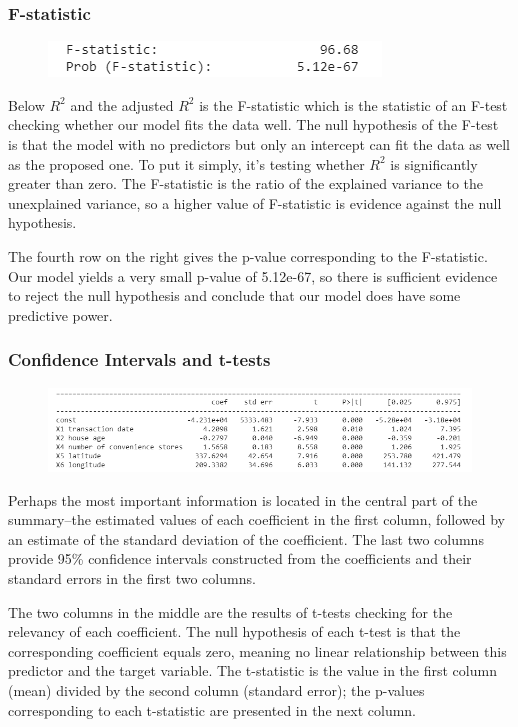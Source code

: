 \documentclass{article}
\begin{document}
\subsubsection*{F-statistic}
\begin{figure}[H]\includegraphics[width=0.5\linewidth]{27}\end{figure}
Below $R^2$ and the adjusted $R^2$ is the F-statistic which is the statistic of an F-test checking whether our model fits the data well. The null hypothesis of the F-test is that the model with no predictors but only an intercept can fit the data as well as the proposed one. To put it simply, it's testing whether $R^2$ is significantly greater than zero. The F-statistic is the ratio of the explained variance to the unexplained variance, so a higher value of F-statistic is evidence against the null hypothesis.

The fourth row on the right gives the p-value corresponding to the F-statistic. Our model yields a very small p-value of 5.12e-67, so there is sufficient evidence to reject the null hypothesis and conclude that our model does have some predictive power.
\subsubsection*{Confidence Intervals and t-tests}
\begin{figure}[H]\includegraphics[width=\linewidth]{28}\end{figure}
Perhaps the most important information is located in the central part of the summary--the estimated values of each coefficient in the first column, followed by an estimate of the standard deviation of the coefficient. The last two columns provide 95\% confidence intervals constructed from the coefficients and their standard errors in the first two columns.

The two columns in the middle are the results of t-tests checking for the relevancy of each coefficient. The null hypothesis of each t-test is that the corresponding coefficient equals zero, meaning no linear relationship between this predictor and the target variable. The t-statistic is the value in the first column (mean) divided by the second column (standard error); the p-values corresponding to each t-statistic are presented in the next column.
\end{document}
